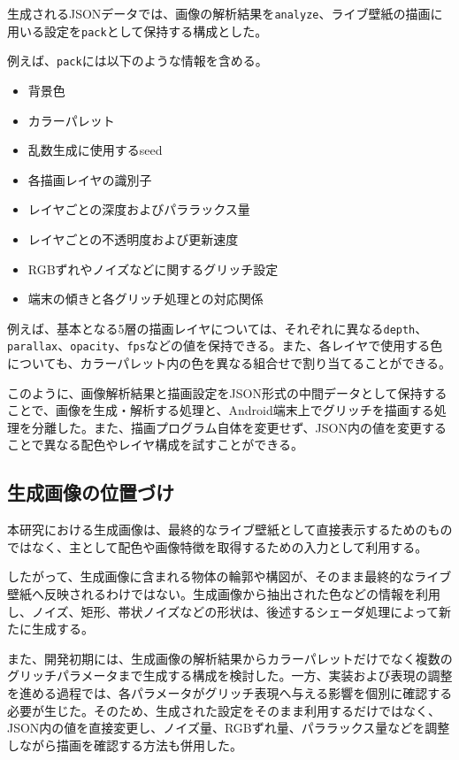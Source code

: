 生成されるJSONデータでは、画像の解析結果を\texttt{analyze}、ライブ壁紙の描画に用いる設定を\texttt{pack}として保持する構成とした。

例えば、\texttt{pack}には以下のような情報を含める。

\begin{itemize}
    \item 背景色
    \item カラーパレット
    \item 乱数生成に使用するseed
    \item 各描画レイヤの識別子
    \item レイヤごとの深度およびパララックス量
    \item レイヤごとの不透明度および更新速度
    \item RGBずれやノイズなどに関するグリッチ設定
    \item 端末の傾きと各グリッチ処理との対応関係
\end{itemize}

例えば、基本となる5層の描画レイヤについては、それぞれに異なる\texttt{depth}、\texttt{parallax}、\texttt{opacity}、\texttt{fps}などの値を保持できる。また、各レイヤで使用する色についても、カラーパレット内の色を異なる組合せで割り当てることができる。

このように、画像解析結果と描画設定をJSON形式の中間データとして保持することで、画像を生成・解析する処理と、Android端末上でグリッチを描画する処理を分離した。また、描画プログラム自体を変更せず、JSON内の値を変更することで異なる配色やレイヤ構成を試すことができる。


\subsection{生成画像の位置づけ}

本研究における生成画像は、最終的なライブ壁紙として直接表示するためのものではなく、主として配色や画像特徴を取得するための入力として利用する。

したがって、生成画像に含まれる物体の輪郭や構図が、そのまま最終的なライブ壁紙へ反映されるわけではない。生成画像から抽出された色などの情報を利用し、ノイズ、矩形、帯状ノイズなどの形状は、後述するシェーダ処理によって新たに生成する。

また、開発初期には、生成画像の解析結果からカラーパレットだけでなく複数のグリッチパラメータまで生成する構成を検討した。一方、実装および表現の調整を進める過程では、各パラメータがグリッチ表現へ与える影響を個別に確認する必要が生じた。そのため、生成された設定をそのまま利用するだけではなく、JSON内の値を直接変更し、ノイズ量、RGBずれ量、パララックス量などを調整しながら描画を確認する方法も併用した。

